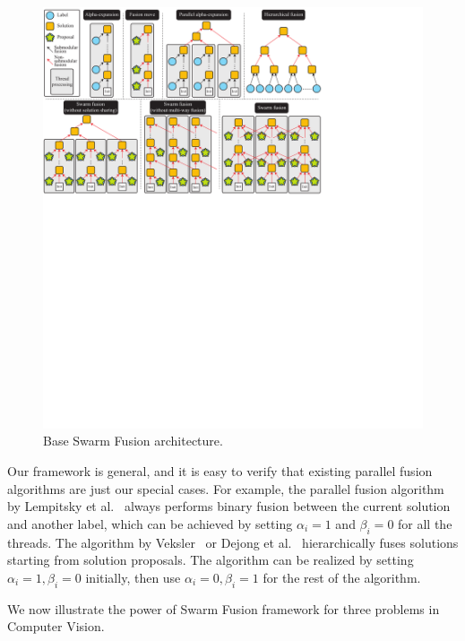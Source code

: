 \begin{figure}[tb]
 \includegraphics[width=\columnwidth]{figure/model.pdf}
 \caption{Base Swarm Fusion architecture.}\label{fig:base}
\end{figure}


 Our framework is
general, and it is easy to verify that existing parallel fusion
algorithms are just our special cases.
%
For example, the parallel fusion algorithm by Lempitsky et
al.~\cite{viktor} always performs binary fusion between the current
solution and another label, which can be achieved by setting $\alpha_i =
1$ and $\beta_i = 0$ for all the threads. The algorithm by
Veksler~\cite{olga} or Dejong et al.~\cite{dejong} hierarchically fuses
solutions starting from solution proposals. The algorithm can be
realized by setting $\alpha_i = 1, \beta_i = 0$ initially, then use
$\alpha_i = 0, \beta_i=1$  for the rest of the algorithm.

\noindent
We now illustrate the power of Swarm Fusion framework for three problems
in Computer Vision. 


